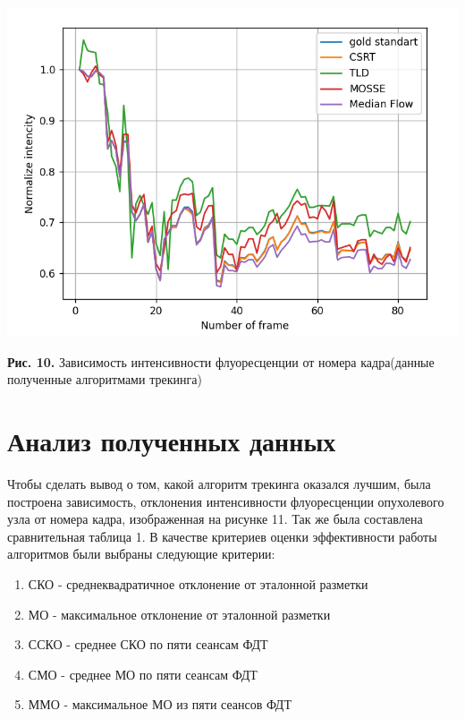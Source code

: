 \documentclass[a4paper,14pt]{extarticle}
\begin{document}
\begin{center}
    \includegraphics[scale = 0.9]{int_all.PNG}
    
    \textbf{Рис. 10.} Зависимость интенсивности флуоресценции от номера кадра(данные полученные алгоритмами трекинга)
\end{center}

\newpage
\section{Анализ полученных данных}
Чтобы сделать вывод о том, какой алгоритм трекинга оказался лучшим, была построена зависимость, отклонения интенсивности флуоресценции опухолевого узла от номера кадра, изображенная на рисунке 11. Так же была составлена сравнительная таблица 1.
В качестве критериев оценки эффективности работы алгоритмов были выбраны следующие критерии:


\begin{enumerate}
    \item СКО - среднеквадратичное отклонение от эталонной разметки
    \item МО - максимальное отклонение от эталонной разметки
    \item ССКО - среднее СКО по пяти сеансам ФДТ
    \item СМО - среднее МО по пяти сеансам ФДТ
    \item ММО - максимальное МО из пяти сеансов ФДТ
\end{enumerate}
\end{document}
